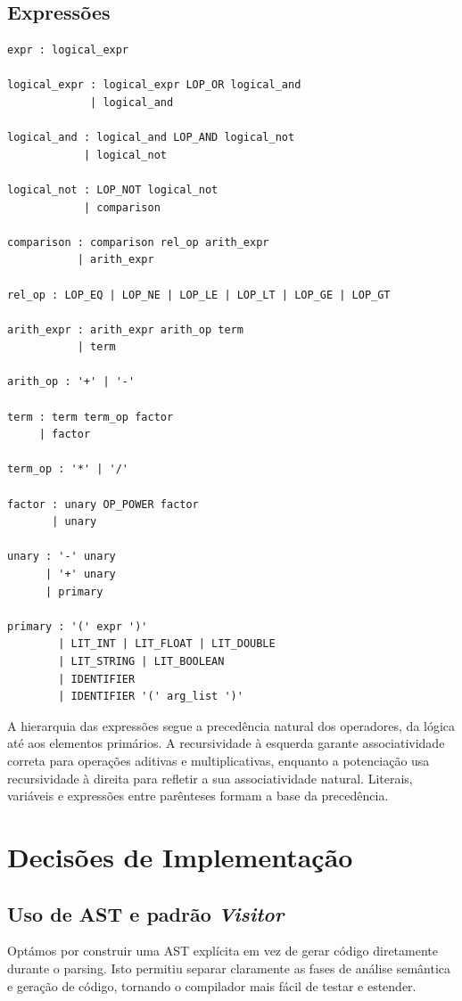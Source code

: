 \documentclass[11pt, a4paper, fleqn]{article}
\begin{document}
\subsection{Expressões}

\begin{lstlisting}
expr : logical_expr

logical_expr : logical_expr LOP_OR logical_and
             | logical_and

logical_and : logical_and LOP_AND logical_not
            | logical_not

logical_not : LOP_NOT logical_not
            | comparison

comparison : comparison rel_op arith_expr
           | arith_expr

rel_op : LOP_EQ | LOP_NE | LOP_LE | LOP_LT | LOP_GE | LOP_GT

arith_expr : arith_expr arith_op term
           | term

arith_op : '+' | '-'

term : term term_op factor
     | factor

term_op : '*' | '/'

factor : unary OP_POWER factor
       | unary

unary : '-' unary
      | '+' unary
      | primary

primary : '(' expr ')'
        | LIT_INT | LIT_FLOAT | LIT_DOUBLE
        | LIT_STRING | LIT_BOOLEAN
        | IDENTIFIER
        | IDENTIFIER '(' arg_list ')'
\end{lstlisting}

\noindent A hierarquia das expressões segue a precedência natural dos operadores, da lógica até aos elementos primários. A recursividade à esquerda garante associatividade correta para operações aditivas e multiplicativas, enquanto a potenciação usa recursividade à direita para refletir a sua associatividade natural. Literais, variáveis e expressões entre parênteses formam a base da precedência.

\section{Decisões de Implementação}

\subsection{Uso de AST e padrão \textit{Visitor}}

Optámos por construir uma AST explícita em vez de gerar código diretamente durante o parsing. Isto permitiu separar claramente as fases de análise semântica e geração de código, tornando o compilador mais fácil de testar e estender. \\
\end{document}
